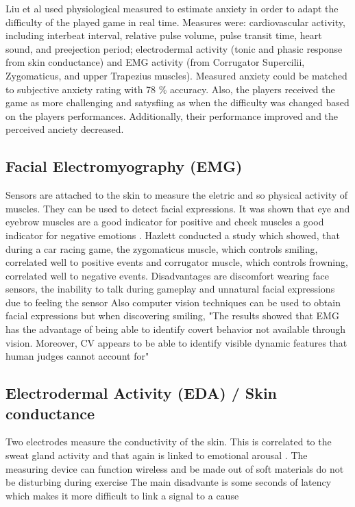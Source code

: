 Liu et al \cite{liu2009dynamic} used physiological measured to estimate anxiety in order to adapt the difficulty of the played game in real time. Measures were: cardiovascular activity, including interbeat interval, relative pulse volume, pulse transit time, heart sound, and preejection period; electrodermal activity (tonic and phasic response from skin conductance) and EMG activity (from Corrugator Supercilii, Zygomaticus, and upper Trapezius muscles). Measured anxiety could be matched to subjective anxiety rating with 78 \% accuracy. Also, the players received the game as more challenging and satysfiing as when the difficulty was changed based on the players performances. Additionally, their performance improved and the perceived anciety decreased.

\subsection{Facial Electromyography (EMG)}
Sensors are attached to the skin to measure the eletric and so physical activity of muscles. They can be used to detect facial expressions. It was shown that eye \cite{ravaja2018phasic} and eyebrow muscles are a good indicator for positive and cheek muscles a good indicator for negative emotions \cite{nacke2015physiological,mandryk2006using}.
Hazlett conducted a study which showed, that during a car racing game, the zygomaticus muscle, which controls smiling, correlated well to positive events and corrugator muscle, which controls frowning, correlated well to negative events.
\cite{hazlett2006measuring}
Disadvantages are discomfort wearing face sensors, the inability to talk during gameplay and unnatural facial expressions due to feeling the sensor \cite{nacke2015physiological}
Also computer vision techniques can be used to obtain facial expressions but when discovering smiling, "The results showed that EMG has the advantage of
being able to identify covert behavior not available through
vision. Moreover, CV appears to be able to identify visible
dynamic features that human judges cannot account for" \cite{hernandez19invisible}

\subsection{Electrodermal Activity (EDA) / Skin conductance}
Two electrodes measure the conductivity of the skin. This is correlated to the sweat gland activity and that again is linked to emotional arousal \cite{nacke2015physiological, dawson2017electrodermal}. The measuring device can function wireless and be made out of soft materials \cite{kim2021soft} do not be disturbing during exercise 
The main disadvante is some seconds of latency which makes it more difficult to link a signal to a cause \cite{nacke2015physiological} 

